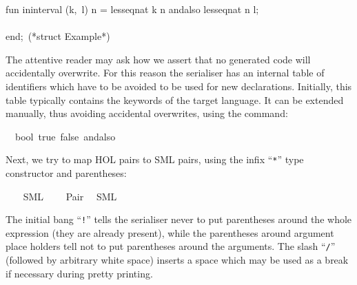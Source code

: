 \begin{isabellebody}
\begin{isamarkuptext}
\hspace*{0pt}fun in{}interval (k,~l) n = less{}eq{}nat k n andalso less{}eq{}nat n l;\\
\hspace*{0pt}\\
\hspace*{0pt}end;~(*struct Example*)%
\end{isamarkuptext}%
\isamarkuptrue%
%
\endisatagquote
{\isafoldquote}%
%
\isadelimquote
%
\endisadelimquote
%
\begin{isamarkuptext}%
\noindent The attentive reader may ask how we assert that no generated
  code will accidentally overwrite.  For this reason the serialiser has
  an internal table of identifiers which have to be avoided to be used
  for new declarations.  Initially, this table typically contains the
  keywords of the target language.  It can be extended manually, thus avoiding
  accidental overwrites, using the \hyperlink{command.code-reserved}{\mbox{}} command:%
\end{isamarkuptext}%
\isamarkuptrue%
%
\isadelimquote
%
\endisadelimquote
%
\isatagquote
{}\isamarkupfalse%
\ {\isachardoublequoteopen}{\isasymSML}{\isachardoublequoteclose}\ bool\ true\ false\ andalso%
\endisatagquote
{\isafoldquote}%
%
\isadelimquote
%
\endisadelimquote
%
\begin{isamarkuptext}%
\noindent Next, we try to map HOL pairs to SML pairs, using the
  infix ``\verb|*|'' type constructor and parentheses:%
\end{isamarkuptext}%
\isamarkuptrue%
%
\isadeliminvisible
%
\endisadeliminvisible
%
\isataginvisible
%
\endisataginvisible
{\isafoldinvisible}%
%
\isadeliminvisible
%
\endisadeliminvisible
%
\isadelimquotett
%
\endisadelimquotett
%
\isatagquotett
{}\isamarkupfalse%
\ {\isacharasterisk}\isanewline
\ \ {\isacharparenleft}SML\ \ {}\ {\isachardoublequoteopen}{\isacharasterisk}{\isachardoublequoteclose}{\isacharparenright}\isanewline
{}\isamarkupfalse%
\ Pair\isanewline
\ \ {\isacharparenleft}SML\ {\isachardoublequoteopen}{\isacharbang}{\isacharparenleft}{\isacharparenleft}{\isacharunderscore}{\isacharparenright}{\isacharcomma}{\isacharslash}\ {\isacharparenleft}{\isacharunderscore}{\isacharparenright}{\isacharparenright}{\isachardoublequoteclose}{\isacharparenright}%
\endisatagquotett
{\isafoldquotett}%
%
\isadelimquotett
%
\endisadelimquotett
%
\begin{isamarkuptext}%
\noindent The initial bang ``\verb|!|'' tells the serialiser
  never to put
  parentheses around the whole expression (they are already present),
  while the parentheses around argument place holders
  tell not to put parentheses around the arguments.
  The slash ``\verb|/|'' (followed by arbitrary white space)
  inserts a space which may be used as a break if necessary
  during pretty printing.


\end{isamarkuptext}
\end{isabellebody}
